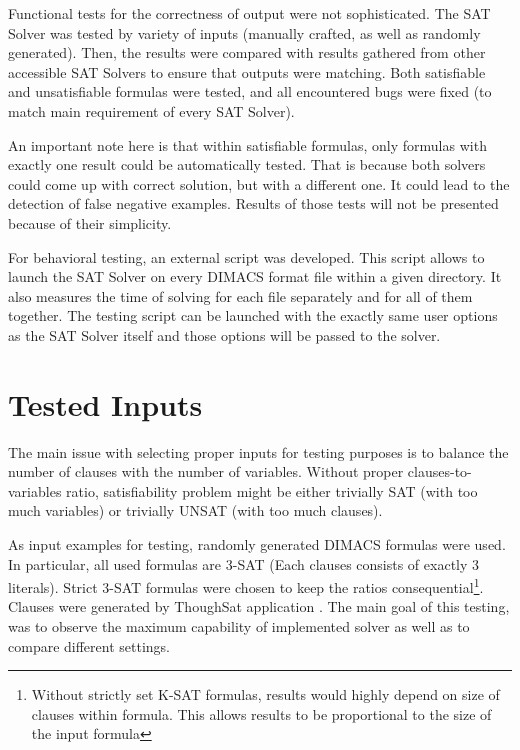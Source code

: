 \documentclass[12pt,english,pdflatex]{aghdpl}
\begin{document}
Functional tests for the correctness of output were not sophisticated.
The SAT  Solver was tested by variety of inputs (manually crafted, as well as
randomly generated). Then, the results were compared with results gathered
from other accessible SAT Solvers to ensure that outputs were matching. Both
satisfiable and unsatisfiable formulas were tested, and all encountered
bugs were fixed (to match main requirement of every SAT Solver). 

An important
note here is that within satisfiable formulas, only formulas with exactly
one result could be automatically tested. That is because both solvers
could come up with correct solution, but with a different one. It could
lead to the detection of false negative examples. Results of those tests
will not be presented  because of their simplicity.

For behavioral testing, an external script was developed. This script
allows to launch the SAT Solver on every DIMACS format file within
a given directory. It also measures the time of solving for each file separately
and for all of them together. The testing script can be launched with the exactly
same user options as the SAT Solver itself and those options will be passed to the solver.

\section{Tested Inputs}
\label{sec:testinputs}

The main issue with selecting proper inputs for testing purposes
is to balance the number of clauses with the number of variables.  
Without proper
clauses-to-variables ratio, satisfiability problem might be either
trivially SAT (with too much variables) or trivially UNSAT (with
too much clauses).

As input examples for testing, randomly generated DIMACS formulas were used.
In particular, all used formulas are 3-SAT (Each clauses consists
of exactly 3 literals). Strict 3-SAT formulas were chosen to keep the ratios consequential\footnote{Without strictly set K-SAT formulas, results would highly depend on size of clauses within formula. This allows results to be proportional to the size of the input formula}. Clauses were generated by ThoughSat
application \cite{ToughSAT}. The main goal of this testing, was to observe
the maximum capability of implemented solver as well as to compare different settings.
\end{document}
